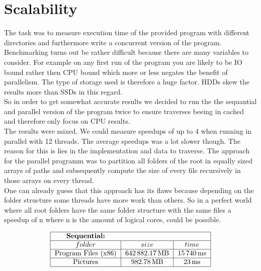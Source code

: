 \documentclass{article}
\begin{document}
  \section{Scalability}
    The task was to measure execution time of the provided program with different directories and furthermore write a concurrent version of the program.
    \\[3pt]
    Benchmarking turns out be rather difficult because there are many variables to consider. For example on any first run of the program you are likely to be IO bound rather then CPU bound which more or less negates the benefit of parallelism. The type of storage used is therefore a huge factor. HDDs skew the results more than SSDs in this regard.
    \\[3pt]
    So in order to get somewhat accurate results we decided to run the the sequantial and parallel version of the program twice to ensure traverses beeing in cached and therefore only focus on CPU results.
    \\[3pt]
    The results were mixed. We could measure speedups of up to 4 when running in parallel with 12 threads. The average speedups was a lot slower though. The reason for this is lies in the implementation and data to traverse. The approach for the parallel programm was to partition all folders of the root in equally sized arrays of paths and subsequently compute the size of every file recursively in those arrays on every thread.
    \\[3pt]
    One can already guess that this approach has its flaws because depending on the folder structure some threads have more work than others. So in a perfect world where all root folders have the same folder structure with the same files a speedup of n where n is the amount of logical cores, could be possible.
    \\[24pt]
    \begin{doublespacing}
      \begin{align*}
        \begin{tabular}{|*{3}{c|}}
          \hline
          \multicolumn{1}{|c}{\bfseries Sequential:} & \multicolumn{1}{c}{} & \multicolumn{1}{c|}{} \\
          \hline
          $folder$ & $size$ & $time$ \\
          \hline
          Program Files (x86) & $\SI{642882.17}{\mega\byte}$ & $\SI{15740}{\milli\second}$ \\
          \hline
          Pictures & $\SI{982.78}{\mega\byte}$ & $\SI{23}{\milli\second}$ \\
          \hline
        \end{tabular}
      \end{align*}
    \end{doublespacing}
\end{document}
